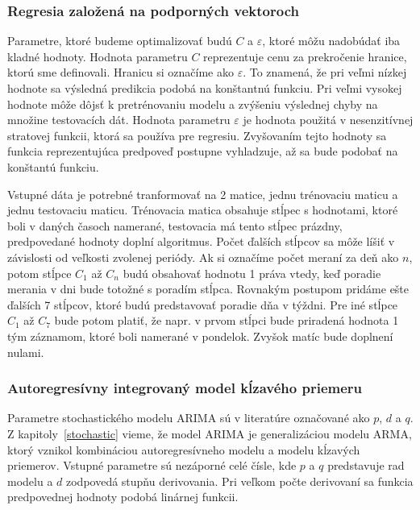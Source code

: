 \documentclass[a4paper,slovak,12pt,appendix]{article}
\begin{document}
\subsubsection{Regresia založená na podporných vektoroch}
Parametre, ktoré budeme optimalizovať budú $C$ a $\varepsilon$, ktoré môžu
nadobúdať iba kladné hodnoty. Hodnota parametru $C$ reprezentuje cenu za
prekročenie hranice, ktorú sme definovali. Hranicu si označíme ako $\varepsilon$.
To znamená, že pri veľmi nízkej hodnote sa výsledná predikcia podobá na
konštantnú funkciu. Pri veľmi vysokej hodnote môže dôjsť k pretrénovaniu modelu
a zvýšeniu výslednej chyby na množine testovacích dát. Hodnota parametru
$\varepsilon$ je hodnota použitá v nesenzitívnej stratovej funkcii, ktorá sa
používa pre regresiu. Zvyšovaním tejto hodnoty sa funkcia reprezentujúca
predpoveď postupne vyhladzuje, až sa bude podobať na konštantú funkciu.

Vstupné dáta je potrebné tranformovať na 2 matice, jednu trénovaciu maticu
a jednu testovaciu maticu. Trénovacia matica obsahuje stĺpec s hodnotami,
ktoré boli v daných časoch namerané, testovacia má tento stĺpec prázdny,
predpovedané hodnoty doplní algoritmus. Počet ďalších stĺpcov sa môže líšiť
v závislosti od veľkosti zvolenej periódy. Ak si označíme počet meraní za deň
ako $n$, potom stĺpce $C_1$ až $C_n$ budú obsahovať hodnotu 1 práva vtedy,
keď poradie merania v dni bude totožné s poradím stĺpca. Rovnakým postupom
pridáme ešte ďalších 7 stĺpcov, ktoré budú predstavovať poradie dňa v týždni.
Pre iné stĺpce $C_1$ až $C_7$ bude potom platiť, že napr. v prvom stĺpci bude
priradená hodnota 1 tým záznamom, ktoré boli namerané v pondelok. Zvyšok matíc
bude doplnení nulami.

\subsubsection{Autoregresívny integrovaný model kĺzavého priemeru}
Parametre stochastického modelu ARIMA sú v literatúre označované ako $p$, $d$
a $q$. Z kapitoly~\ref{stochastic} vieme, že model ARIMA je generalizáciou
modelu ARMA, ktorý vznikol kombináciou autoregresívneho modelu a modelu
kĺzavých priemerov. Vstupné parametre sú nezáporné celé čísle, kde $p$ a $q$
predstavuje rad modelu a $d$ zodpovedá stupňu derivovania. Pri veľkom počte
derivovaní sa funkcia predpovednej hodnoty podobá linárnej funkcii.
\end{document}
